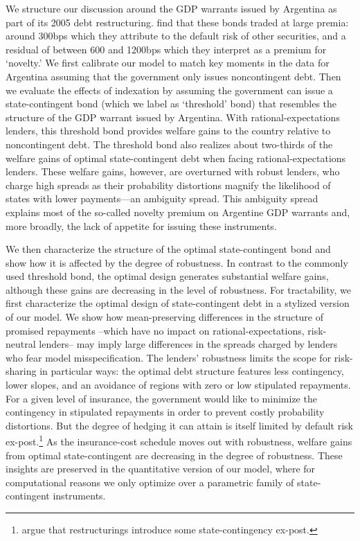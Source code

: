 We structure our discussion around the GDP warrants issued by Argentina as part of its 2005 debt restructuring.  \citet*{ChamonCostaRicci2008} find that these bonds traded at large premia: around 300bps which they attribute to the default risk of other securities, and a residual of between 600 and 1200bps which they interpret as a premium for `novelty.' We first calibrate our model to match key moments in the data for Argentina assuming that the government only issues noncontingent debt. Then we evaluate the effects of indexation by assuming the government can issue a state-contingent bond (which we label as `threshold' bond) that resembles the structure of the GDP warrant issued by Argentina. With rational-expectations lenders, this threshold bond provides welfare gains to the country relative to noncontingent debt. The threshold bond also realizes about two-thirds of the welfare gains of optimal state-contingent debt when facing rational-expectations lenders. These welfare gains, however, are overturned with robust lenders, who charge high spreads as their probability distortions magnify the likelihood of states with lower payments---an ambiguity spread. This ambiguity spread explains most of the so-called novelty premium on Argentine GDP warrants and, more broadly, the lack of appetite for issuing these instruments.

We then characterize the structure of the optimal state-contingent bond and show how it is affected by the degree of robustness.  In contrast to the commonly used threshold bond, the optimal design generates substantial welfare gains, although these gains are decreasing in the level of robustness. For tractability, we first characterize the optimal design of state-contingent debt in a stylized version of our model. We show how mean-preserving differences in the structure of promised repayments --which have no impact on rational-expectations, risk-neutral lenders-- may imply large differences in the spreads charged by lenders who fear model misspecification. The lenders' robustness limits the scope for risk-sharing in particular ways: the optimal debt structure features less contingency, lower slopes, and an avoidance of regions with zero or low stipulated repayments. For a given level of insurance, the government would like to minimize the contingency in stipulated repayments in order to prevent costly probability distortions. But the degree of hedging it can attain is itself limited by default risk ex-post.\footnote{\citet*{DvorkinSanchezSaprizaYurdagul} argue that restructurings introduce some state-contingency ex-post.} As the insurance-cost schedule moves out with robustness, welfare gains from optimal state-contingent are decreasing in the degree of robustness. These insights are preserved in the quantitative version of our model, where for computational reasons we only optimize over a parametric family of state-contingent instruments.

